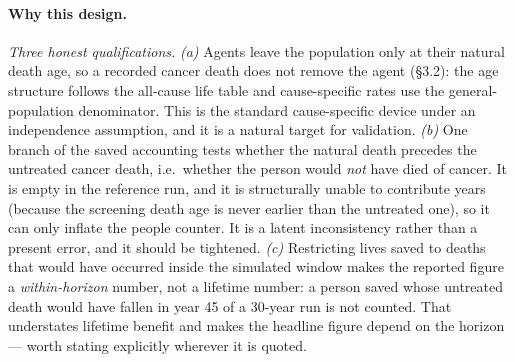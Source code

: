 \documentclass[12pt,a4paper]{article}
\newcommand{\why}[1]{\paragraph{Why this design.} #1}
\begin{document}
\why{\emph{Three honest qualifications.}
\emph{(a)} Agents leave the population only at their natural death age, so a recorded cancer death does not
remove the agent (\S3.2): the age structure follows the all-cause life table and cause-specific rates use
the general-population denominator. This is the standard cause-specific device under an independence
assumption, and it is a natural target for validation.
\emph{(b)} One branch of the saved accounting tests whether the natural death precedes the untreated
cancer death, i.e.\ whether the person would \emph{not} have died of cancer. It is empty in the reference
run, and it is structurally unable to contribute years (because the screening death age is never earlier
than the untreated one), so it can only inflate the people counter. It is a latent inconsistency rather
than a present error, and it should be tightened.
\emph{(c)} Restricting lives saved to deaths that would have occurred inside the simulated window makes the
reported figure a \emph{within-horizon} number, not a lifetime number: a person saved whose untreated death
would have fallen in year 45 of a 30-year run is not counted. That understates lifetime benefit and makes
the headline figure depend on the horizon --- worth stating explicitly wherever it is quoted.}
\end{document}
